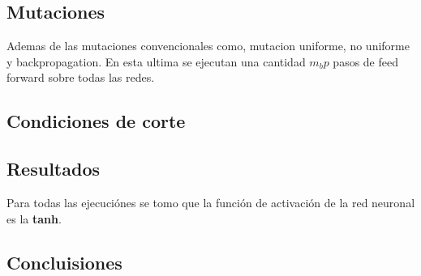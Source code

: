 \documentclass{article}
\begin{document}
\subsection{Mutaciones}
Ademas de las mutaciones convencionales como, mutacion uniforme, no uniforme y backpropagation. En esta ultima se ejecutan una cantidad $m_bp$ pasos de feed forward sobre todas las redes.
\subsection{Condiciones de corte}

\subsection{Resultados}
Para todas las ejecuciónes se tomo que la función de activación de la red neuronal es la \textbf{tanh}.

\subsection{Concluisiones}
\end{document}
